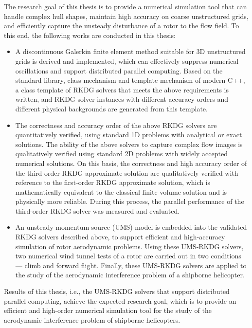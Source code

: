 \begin{eabstract}
The research goal of this thesis is to provide a numerical simulation tool that can handle complex hull shapes, maintain high accuracy on coarse unstructured grids, and efficiently capture the unsteady disturbance of a rotor to the flow field.
To this end, the following works are conducted in this thesis:
\begin{itemize}
\item A discontinuous Galerkin finite element method suitable for 3D unstructured grids is derived and implemented, which can effectively suppress numerical oscillations and support distributed parallel computing. Based on the standard library, class mechanism and template mechanism of modern C++, a class template of RKDG solvers that meets the above requirements is written, and RKDG solver instances with different accuracy orders and different physical backgrounds are generated from this template.
\item The correctness and accuracy order of the above RKDG solvers are quantitatively verified, using standard 1D problems with analytical or exact solutions. The ability of the above solvers to capture complex flow images is qualitatively verified using standard 2D  problems with widely accepted numerical solutions. On this basis, the correctness and high accuracy order of the third-order RKDG approximate solution are qualitatively verified with reference to the first-order RKDG approximate solution, which is mathematically equivalent to the classical finite volume solution and is physically more reliable. During this process, the parallel performance of the third-order RKDG solver was measured and evaluated.
\item An unsteady momentum source (UMS) model is embedded into the validated RKDG solvers described above, to support efficient and high-accuracy simulation of rotor aerodynamic problems. Using these UMS-RKDG solvers, two numerical wind tunnel tests of a rotor are carried out in two conditions --- climb and forward flight. Finally, these UMS-RKDG solvers are applied to the study of the aerodynamic interference problem of a shipborne helicopter.
\end{itemize}

Results of this thesis, i.e., the UMS-RKDG solvers that support distributed parallel computing, achieve the expected research goal, which is to provide an efficient and high-order numerical simulation tool for the study of the aerodynamic interference problem of shipborne helicopters.
\end{eabstract}